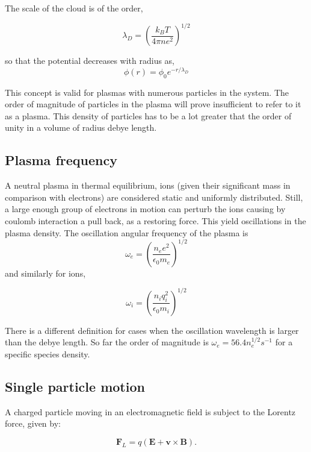 \documentclass[smallextended]{svjour3}
\begin{document}
The scale of the cloud is of the order,

\begin{equation}
    \lambda_D = \left( \frac{k_B T}{4\pi n e^2}\right)^{1/2}
\end{equation}

so that the potential decreases with radius as,
\begin{equation}
\phi(r) = \phi_0 e^{-r/\lambda_D}
\end{equation}

This concept is valid for plasmas with numerous particles in the system. The order of magnitude of particles in the plasma will prove insufficient to  refer to it as a plasma. This density of particles has to be a lot greater that the order of unity in a volume of radius debye length.

\subsection{Plasma frequency}

A neutral plasma in thermal equilibrium, ions (given their significant mass in comparison with electrons) are considered static and uniformly distributed. Still, a large enough group of electrons in motion can perturb the ions causing by coulomb interaction a pull back, as a restoring force. This yield oscillations in the plasma density.
The oscillation angular frequency of the plasma is
\begin{equation}
    \omega_e = \left( \frac{n_e e^2}{\epsilon_0 m_e}\right)^{1/2}
\end{equation}
and similarly for ions,

\begin{equation}
    \omega_i = \left( \frac{n_i q_i^2}{\epsilon_0 m_i}\right)^{1/2}
\end{equation}

There is a different definition for cases when the oscillation wavelength is larger than the debye length. So far the order of magnitude is $\omega_e = 56.4 n_e^{1/2} s^{-1}$ for a specific species density.

\subsection{Single particle motion}

A charged particle moving in an electromagnetic field is subject to the Lorentz force, given by:

\begin{equation}
    \mathbf{F}_L = q (\mathbf{E} + \mathbf{v} \times \mathbf{B}).
\end{equation}
\end{document}
